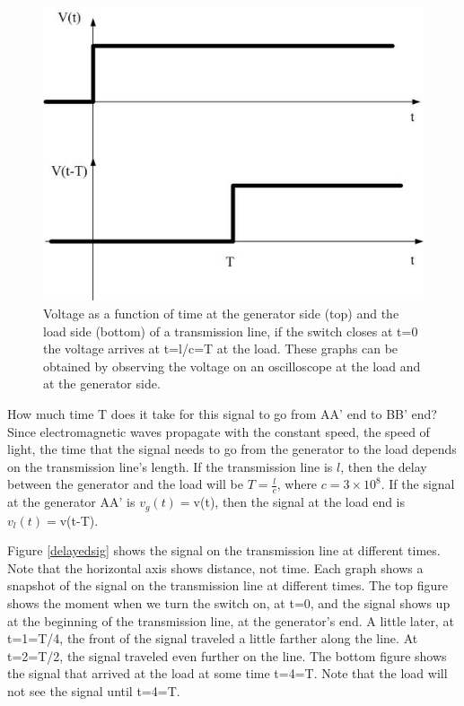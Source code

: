 \documentclass{ximera}
\begin{document}
\begin{figure}[htbp]
\begin{center}
\includegraphics[scale=0.5]{../jpg/timedelayedsignal.jpg}  
\end{center}
\caption{Voltage as a function of time at the generator side (top) and the load side (bottom) of a transmission line, if the switch closes at t=0 the voltage arrives at t=l/c=T at the load. These graphs can be obtained by observing the voltage on an oscilloscope at the load and at the generator side.}
\label{timedelaysig} 
 \end{figure}





 How much time T does it take for this signal to go from AA' end to BB' end? 
Since electromagnetic waves propagate with the constant speed, the speed of light,  the time that the signal needs to go from the generator to the load depends on the transmission line's length. If the transmission line is $l$, then the delay between the generator and the load will be  $T=\frac{l}{c}$, where $c=3\times 10^8$. If the signal at the generator AA' is $v_g(t)=$v(t), then the signal at the load end is $v_l(t)=$v(t-T). 


Figure \ref{delayedsig} shows the signal on the transmission line at different times. Note that the horizontal axis shows distance, not time. Each graph shows a snapshot of the signal on the transmission line at different times. The top figure shows the moment when we turn the switch on, at t=0, and the signal shows up at the beginning of the transmission line, at the generator's end. A little later, at t=1=T/4, the front of the signal traveled a little farther along the line. At t=2=T/2, the signal traveled even further on the line. The bottom figure shows the signal that arrived at the load at some time t=4=T. Note that the load will not see the signal until t=4=T. 
\end{document}
